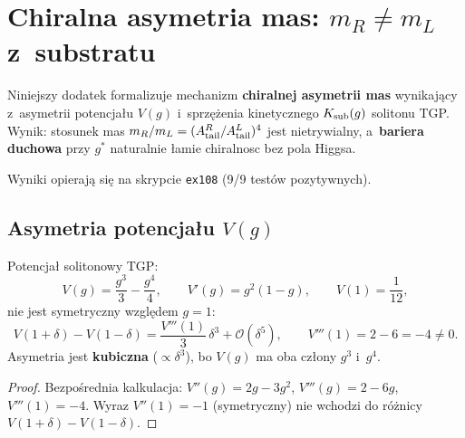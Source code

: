 \section{Chiralna asymetria mas: $m_R \neq m_L$ z~substratu}%
\label{app:K2-chiralnosc}

Niniejszy dodatek formalizuje mechanizm \textbf{chiralnej asymetrii
mas} wynikaj\k{a}cy z~asymetrii potencja\l{}u $V(g)$ i~sprzę\.zenia
kinetycznego $K_{\rm sub}(g)$ solitonu TGP.
Wynik: stosunek mas $m_R/m_L = (A_{\rm tail}^R/A_{\rm tail}^L)^4$
jest nietrywialny, a~\textbf{bariera duchowa} przy $g^*$ naturalnie
\l{}amie chiralnosc bez pola Higgsa.

Wyniki opieraj\k{a} si\k{e} na skrypcie \texttt{ex108} (9/9 test\'ow
pozytywnych).

\subsection{Asymetria potencja\l{}u $V(g)$}\label{app:K2-Vasym}

\begin{proposition}\label{prop:K2-Vasym}
Potencja\l{} solitonowy TGP:
\begin{equation}\label{eq:K2-V}
  V(g) = \frac{g^3}{3} - \frac{g^4}{4},
  \qquad
  V'(g) = g^2(1 - g),
  \qquad
  V(1) = \frac{1}{12},
\end{equation}
nie jest symetryczny wzgl\k{e}dem $g = 1$:
\begin{equation}\label{eq:K2-Vasym-expansion}
  V(1+\delta) - V(1-\delta)
  = \frac{V'''(1)}{3}\,\delta^3 + \mathcal{O}(\delta^5),
  \qquad
  V'''(1) = 2 - 6 = -4 \neq 0.
\end{equation}
Asymetria jest \textbf{kubiczna} ($\propto \delta^3$),
bo $V(g)$ ma oba cz\l{}ony $g^3$ i~$g^4$.
\end{proposition}

\begin{proof}
Bezpo\'srednia kalkulacja: $V''(g) = 2g - 3g^2$, $V'''(g) = 2 - 6g$,
$V'''(1) = -4$. Wyraz $V''(1) = -1$ (symetryczny) nie wchodzi
do r\'o\.znicy $V(1{+}\delta) - V(1{-}\delta)$.
\end{proof}

